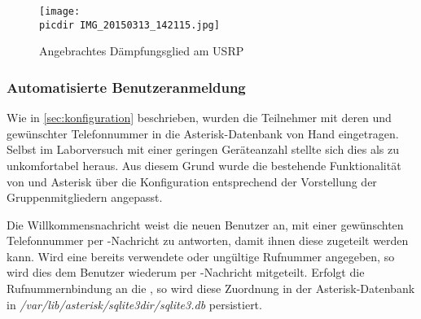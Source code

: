 \begin{figure}[h!]
	\centering
	\texttt{[image: \\picdir IMG\_20150313\_142115.jpg]}
	\caption{Angebrachtes Dämpfungsglied am \acs*{USRP}}
	\label{fig:attenuator}
\end{figure}


\subsubsection{Automatisierte Benutzeranmeldung}
Wie in \autoref{sec:konfiguration} beschrieben, wurden die Teilnehmer mit deren \IMSI und gewünschter Telefonnummer in die Asterisk-Datenbank von Hand eingetragen. Selbst im Laborversuch mit einer geringen Geräteanzahl stellte sich dies als zu unkomfortabel heraus.
Aus diesem Grund wurde die bestehende Funktionalität von \OpenBTS und Asterisk über die Konfiguration entsprechend der Vorstellung der Gruppenmitgliedern angepasst.

Die Willkommensnachricht weist die neuen Benutzer an, mit einer gewünschten Telefonnummer per \SMS-Nachricht zu antworten, damit ihnen diese zugeteilt werden kann. Wird eine bereits verwendete oder ungültige Rufnummer angegeben, so wird dies dem Benutzer wiederum per \SMS-Nachricht mitgeteilt.
Erfolgt die Rufnummernbindung an die \IMSI, so wird diese Zuordnung in der Asterisk-Datenbank in \emph{/var/lib/asterisk/sqlite3dir/sqlite3.db} persistiert.

